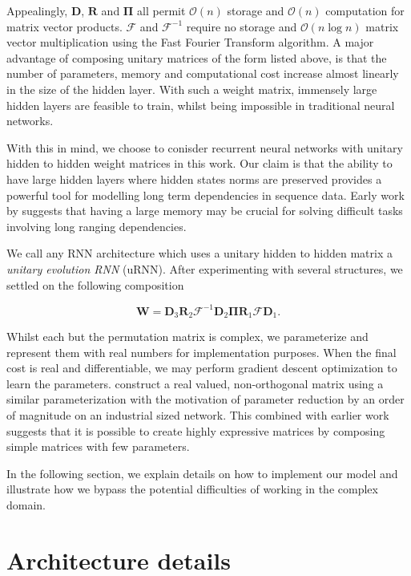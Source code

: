 \documentclass{article} %
\newcommand{\matr}[1]{\mathbf{#1}}
\begin{document}
Appealingly, $\matr{D}$, $\matr{R}$ and $\matr{\Pi}$ all permit $\mathcal{O}(n)$ storage and 
$\mathcal{O}(n)$ computation for matrix vector products. $\mathcal{F}$ and $\mathcal{F}^{-1}$
require no storage and $\mathcal{O}(n \log n)$ matrix vector multiplication using the Fast Fourier
Transform algorithm. A major advantage of composing unitary matrices of the form listed above, is 
that the number of parameters, memory and computational cost increase almost linearly in the size
of the hidden layer. With such a weight matrix, immensely large hidden layers are feasible to train, 
whilst being impossible in traditional neural networks. 
 
With this in mind, we choose to conisder recurrent neural networks with unitary hidden to hidden
weight matrices in this work. Our claim is that the ability to have large hidden layers where hidden 
states norms are preserved provides a powerful tool for modelling long term dependencies in sequence data. 
Early work by \cite{Yoshua94} suggests that having a large memory may be crucial for solving 
difficult tasks involving long ranging dependencies.

We call any RNN architecture which uses a unitary hidden to hidden matrix a \textit{unitary evolution RNN}
(uRNN). After experimenting with several structures, we settled on the following composition

\begin{equation} \matr{W} = \matr{D}_3 \matr{R}_2 \mathcal{F}^{-1} \matr{D}_2 \matr{\Pi} \matr{R}_1 \mathcal{F} \matr{D}_1 .\end{equation}

Whilst each but the permutation matrix is complex, we parameterize and represent them with real numbers
for implementation purposes. When the final cost is real and differentiable, we may perform gradient descent 
optimization to learn the parameters.
\cite{dfc} construct a real valued, non-orthogonal matrix using a similar parameterization with the motivation
of parameter reduction by an order of magnitude on an industrial sized network. This combined with earlier
work \cite{fastfood} suggests that it is possible to create highly expressive matrices by composing simple
matrices with few parameters.

In the following section, we explain details on how to implement our model and illustrate how we bypass the
potential difficulties of working in the complex domain.

\section{Architecture details}
\end{document}
